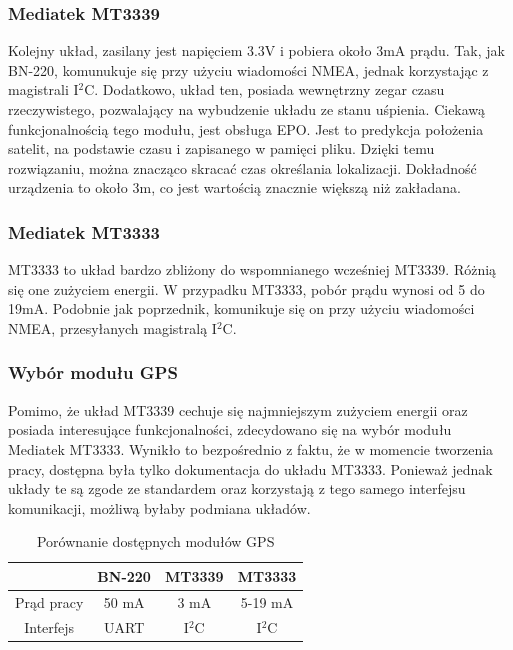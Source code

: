 \subsubsection{Mediatek MT3339}
Kolejny układ, zasilany jest napięciem 3.3V i pobiera około 3mA prądu. Tak, jak BN-220, komunukuje się przy użyciu wiadomości NMEA, jednak korzystając z magistrali I$^{2}$C. Dodatkowo, układ ten, posiada wewnętrzny zegar czasu rzeczywistego, pozwalający na wybudzenie układu ze stanu uśpienia. Ciekawą funkcjonalnością tego modułu, jest obsługa EPO. Jest to predykcja położenia satelit, na podstawie czasu i zapisanego w pamięci pliku. Dzięki temu rozwiązaniu, można znacząco skracać czas określania lokalizacji. Dokładność urządzenia to około 3m, co jest wartością znacznie większą niż zakładana.\cite{MT3339}

\subsubsection{Mediatek MT3333}
MT3333 to układ bardzo zbliżony do wspomnianego wcześniej MT3339. Różnią się one zużyciem energii. W przypadku MT3333, pobór prądu wynosi od 5 do 19mA. Podobnie jak poprzednik, komunikuje się on przy użyciu wiadomości NMEA, przesyłanych magistralą I$^{2}$C.\cite{MT3333}

\subsubsection{Wybór modułu GPS}
Pomimo, że układ MT3339 cechuje się najmniejszym zużyciem energii oraz posiada interesujące funkcjonalności, zdecydowano się na wybór modułu Mediatek MT3333. Wynikło to bezpośrednio z faktu, że w momencie tworzenia pracy, dostępna była tylko dokumentacja do układu MT3333. Ponieważ jednak układy te są zgode ze standardem oraz korzystają z tego samego interfejsu komunikacji, możliwą byłaby podmiana układów.

\begin{table}[h]
    \centering
    \begin{tabular}{|c | c | c | c|}
        \hline
         & BN-220 & MT3339 & MT3333 \\
        \hline
        Prąd pracy  & 50 mA & 3 mA &5-19 mA \\
        \hline
        Interfejs & UART & I$^{2}$C & I$^{2}$C\\
        \hline
    \end{tabular}
    \caption{Porównanie dostępnych modułów GPS}
    \label{tab:gps}
    \end{table}


